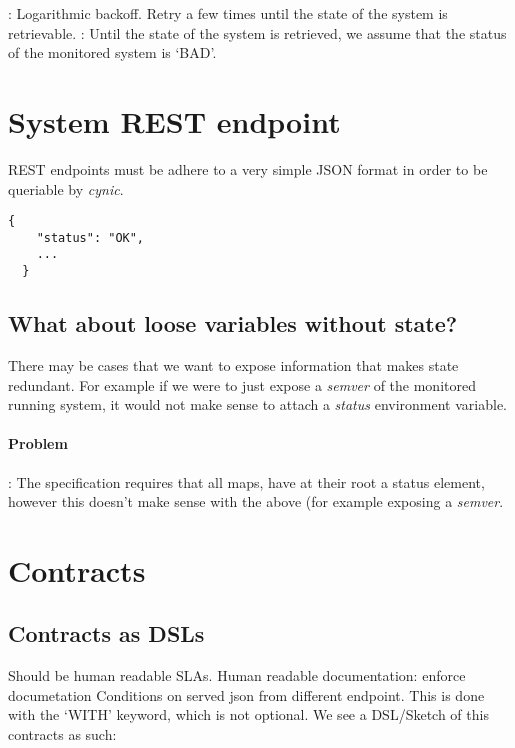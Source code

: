 \documentclass[12pt,twoside]{article}
\newcommand{\projectname}[0]{\textit{cynic}}
\begin{document}
\begin{itemize}
  : Logarithmic backoff. Retry a few times until the
    state of the system is retrievable.
  : Until the state of the system is retrieved, we
    assume that the status of the monitored system is `BAD'.
\end{itemize}

\section{System REST endpoint}
REST endpoints must be adhere to a very simple JSON format in order to
be queriable by \projectname.
\begin{lstlisting}[caption='Sample REST endpoint]
  {
    "status": "OK",
    ...
  }
\end{lstlisting}

\subsection{What about loose variables without state?}
There may be cases that we want to expose information that makes state
redundant. For example if we were to just expose a \textit{semver} of
the monitored running system, it would not make sense to attach a
\textit{status} environment variable.

\paragraph{Problem}: The specification requires that all maps, have at
their root a status element, however this doesn't make sense with the
above (for example exposing a \textit{semver}.

\section{Contracts}
\subsection{Contracts as DSLs}
Should be human readable SLAs. Human readable documentation: enforce
documetation Conditions on served json from different endpoint. This
is done with the `WITH' keyword, which is not optional. We see a
DSL/Sketch of this contracts as such:
\end{document}
